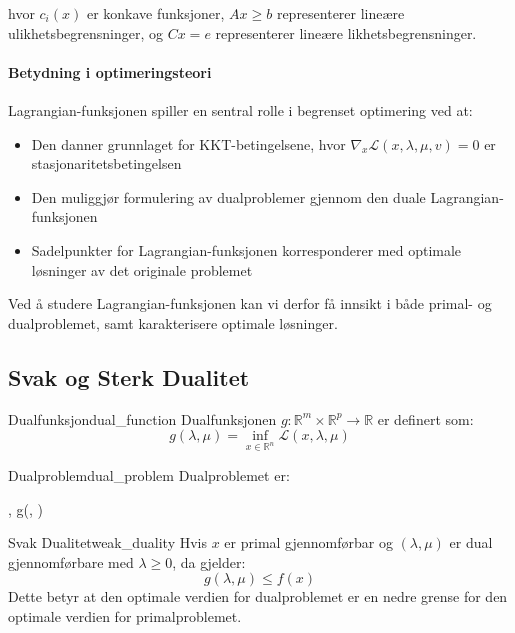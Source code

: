 hvor \(c_i(x)\) er konkave funksjoner, \(Ax \geq b\) representerer lineære ulikhetsbegrensninger, og \(Cx = e\) representerer lineære likhetsbegrensninger.

\paragraph{Betydning i optimeringsteori}
Lagrangian-funksjonen spiller en sentral rolle i begrenset optimering ved at:
\begin{itemize}
	\item Den danner grunnlaget for KKT-betingelsene, hvor \( \nabla_x \mathcal{L}(x, \lambda, \mu, v) = 0 \) er stasjonaritetsbetingelsen
	\item Den muliggjør formulering av dualproblemer gjennom den duale Lagrangian-funksjonen
	\item Sadelpunkter for Lagrangian-funksjonen korresponderer med optimale løsninger av det originale problemet
\end{itemize}

Ved å studere Lagrangian-funksjonen kan vi derfor få innsikt i både primal- og dualproblemet, samt karakterisere optimale løsninger.

\subsection{Svak og Sterk Dualitet}

\begin{definition}{Dualfunksjon}{dual_function}
	Dualfunksjonen \( g: \mathbb{R}^m \times \mathbb{R}^p \to \mathbb{R} \) er definert som:
	\[
		g(\lambda, \mu) = \inf_{x \in \mathbb{R}^n} \mathcal{L}(x, \lambda, \mu)
	\]
\end{definition}

\begin{definition}{Dualproblem}{dual_problem}
	Dualproblemet er:
	\begin{maxi*}
		{\lambda {}, \mu}{g(\lambda, \mu)}{}{}
	\end{maxi*}
\end{definition}

\begin{theorem}{Svak Dualitet}{weak_duality}
	Hvis \( x \) er primal gjennomførbar og \( (\lambda, \mu) \) er dual gjennomførbare med \( \lambda \geq 0 \), da gjelder:
	\[
		g(\lambda, \mu) \leq f(x)
	\]
	Dette betyr at den optimale verdien for dualproblemet er en nedre grense for den optimale verdien for primalproblemet.
\end{theorem}

